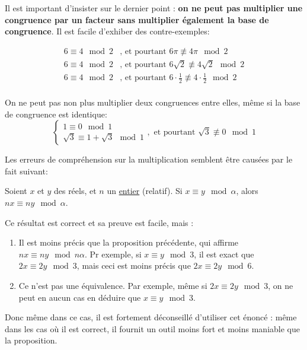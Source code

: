 \begin{attention}
Il est important d'insister sur le dernier point : \textbf{on ne peut pas multiplier une congruence par un facteur sans multiplier également la base de congruence}. Il est facile d'exhiber des contre-exemples:

\begin{align*}
6\equiv 4 \mod 2 &\text{, et pourtant } 6\pi \not\equiv 4\pi \mod 2\\
6\equiv 4 \mod 2 &\text{, et pourtant } 6\sqrt2 \not\equiv 4\sqrt2 \mod 2\\
6\equiv 4 \mod 2 &\text{, et pourtant } 6\cdot \frac12 \not\equiv 4\cdot\frac12 \mod 2\\
\end{align*}

On ne peut pas non plus multiplier deux congruences entre elles, même si la base de congruence est identique:
\[ \begin{cases} 1\equiv 0 \mod 1\\ \sqrt 3 \equiv 1+\sqrt 3 \mod 1\end{cases}, \text{ et pourtant }
\sqrt 3 \not\equiv 0 \mod 1
\]
\end{attention}

\begin{mdframed}
Les erreurs de compréhension sur la multiplication semblent être causées par le fait suivant:
\begin{exercice}
Soient $x$ et $y$ des réels, et $n$ un \underline{entier} (relatif). Si $x\equiv y\mod \alpha$, alors $nx\equiv ny \mod \alpha$.
\end{exercice}
Ce résultat est correct et sa preuve est facile, mais :
\begin{enumerate}
\item Il est moins précis que la proposition précédente, qui affirme $nx\equiv ny \mod n\alpha$. Pr exemple, si $x\equiv y \mod 3$, il est exact que $2x\equiv 2y \mod 3$, mais ceci est moins précis que $2x\equiv 2y \mod 6$.
\item Ce n'est pas une équivalence. Par exemple, même si $2x\equiv 2y \mod 3$, on ne peut en aucun cas en déduire que $x\equiv y \mod 3$.
\end{enumerate}
Donc même dans ce cas, il est fortement déconseillé d'utiliser cet énoncé : même dans les cas où il est correct, il fournit un outil moins fort et moins maniable que la proposition.
\end{mdframed}

